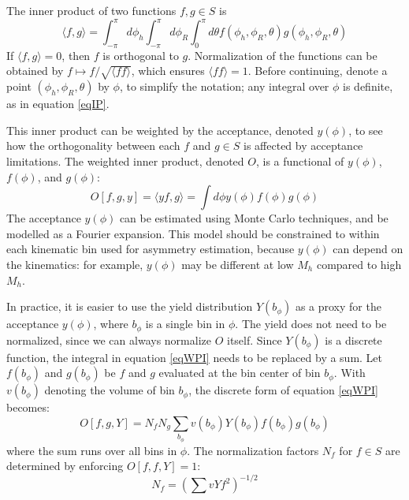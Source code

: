 \documentclass[12pt]{article}
\begin{document}
The inner product of two functions $f,g\in S$ is
\begin{equation}
\langle f,g\rangle=
\int_{-\pi}^{\pi}d\phi_h
\int_{-\pi}^{\pi}d\phi_R
\int_{0}^{\pi}d\theta
f\left(\phi_h,\phi_R,\theta\right)
g\left(\phi_h,\phi_R,\theta\right)
\label{eqIP}
\end{equation}
If $\langle f,g\rangle=0$, then $f$ is orthogonal to $g$. Normalization of the
functions can be obtained by $f\mapsto f/\sqrt{\langle ff\rangle}$, which
ensures $\langle ff\rangle=1$.  
Before continuing, denote a point $\left(\phi_h,\phi_R,\theta\right)$ by $\phi$,
to simplify the notation; any integral over $\phi$ is definite, as in equation
\ref{eqIP}.

This inner product can be weighted by the acceptance, denoted $y(\phi)$, to see how the
orthogonality between each $f$ and $g\in S$ is affected by acceptance
limitations. The weighted inner product, denoted $O$,
is a functional of $y(\phi)$, $f(\phi)$, and $g(\phi)$:
\begin{equation}
O\left[f,g,y\right]=\langle yf,g\rangle=\int{d\phi y(\phi)f(\phi)g(\phi)}
\label{eqWPI}
\end{equation}
The acceptance $y(\phi)$ can be estimated using Monte Carlo techniques, and be
modelled as a Fourier expansion. This model should be constrained to within each
kinematic bin used for asymmetry estimation, because $y(\phi)$ can depend on the
kinematics: for example, $y(\phi)$ may be different at low $M_h$ compared to
high $M_h$.

In practice, it is easier to use the yield distribution $Y(b_\phi)$ as a proxy for the
acceptance $y(\phi)$, where $b_\phi$ is a single bin in $\phi$. The yield does
not need to be normalized, since we can always normalize $O$ itself. Since
$Y(b_\phi)$ is a discrete function, the integral in equation \ref{eqWPI} needs
to be replaced by a sum. Let $f(b_\phi)$ and $g(b_\phi)$ be $f$ and $g$
evaluated at the bin center of bin $b_\phi$. With $v(b_\phi)$ denoting the volume of
bin $b_\phi$, the discrete form of equation \ref{eqWPI} becomes:
\begin{equation}
\displaystyle
O[f,g,Y]=N_fN_g\sum_{b_\phi}{
  v(b_\phi)Y(b_\phi)f(b_\phi)g(b_\phi)
}
\end{equation}
where the sum runs over all bins in $\phi$.
The normalization factors $N_f$ for $f\in S$ are determined by enforcing
$O[f,f,Y]=1$:
\begin{equation}
\displaystyle
N_f=\left(\sum{vYf^2}\right)^{-1/2}
\end{equation}
\end{document}
